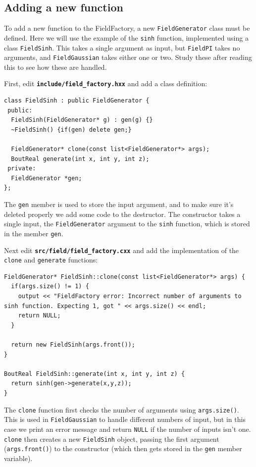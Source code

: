 \documentclass[12pt]{article}
\newcommand{\file}[1]{\texttt{\bf #1}}
\begin{document}
\subsection{Adding a new function}

To add a new function to the FieldFactory, a new \lstinline!FieldGenerator! class
must be defined. Here we will use the example of the \lstinline!sinh! function, implemented
using a class \lstinline!FieldSinh!. This takes a single argument as input, but
\lstinline!FieldPI! takes no arguments, and \lstinline!FieldGaussian! takes either one or two.
Study these after reading this to see how these are handled.

First, edit \file{include/field\_factory.hxx} and add a class definition:
\begin{lstlisting}[firstnumber=122]
class FieldSinh : public FieldGenerator {
 public:
  FieldSinh(FieldGenerator* g) : gen(g) {}
  ~FieldSinh() {if(gen) delete gen;}

  FieldGenerator* clone(const list<FieldGenerator*> args);
  BoutReal generate(int x, int y, int z);
 private:
  FieldGenerator *gen;
};
\end{lstlisting}

The \lstinline!gen! member is used to store the input argument, and to make sure it's deleted
properly we add some code to the destructor. The constructor takes a single input, the \lstinline!FieldGenerator! argument to the \lstinline!sinh! function, which is stored in the member \lstinline!gen!.

Next edit \file{src/field/field\_factory.cxx} and add the implementation of the \lstinline!clone! and
\lstinline!generate! functions:
\begin{lstlisting}[firstnumber=100]
FieldGenerator* FieldSinh::clone(const list<FieldGenerator*> args) {
  if(args.size() != 1) {
    output << "FieldFactory error: Incorrect number of arguments to sinh function. Expecting 1, got " << args.size() << endl;
    return NULL;
  }

  return new FieldSinh(args.front());
}

BoutReal FieldSinh::generate(int x, int y, int z) {
  return sinh(gen->generate(x,y,z));
}
\end{lstlisting}

The \lstinline!clone! function first checks the number of arguments using \lstinline!args.size()!. This
is used in \lstinline!FieldGaussian! to handle different numbers of input, but in this case we
print an error message and return \lstinline!NULL! if the number of inputs isn't one. \lstinline!clone! then creates
a new \lstinline!FieldSinh! object, passing the first argument (\lstinline!args.front()!) to the constructor (which
then gets stored in the \lstinline!gen! member variable).
\end{document}
